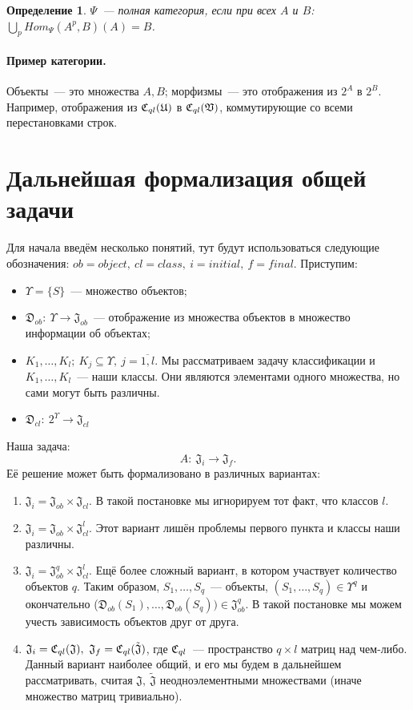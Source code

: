 \documentclass[a4paper, 12pt]{report}
\newtheorem{definition}{Определение}[chapter]
\begin{document}
\begin{definition}
$\Psi$~--- полная категория, если при всех $A$ и  $B$: $ \bigcup\limits_p Hom_{\Psi}(A^p, B)(A) = B$.
\end{definition}

\paragraph{Пример категории.} Объекты~--- это множества $A, B$; морфизмы~--- это отображения из $2^A$ в $2^B$. Например, отображения из $\mathfrak{C}_{ql}(\mathfrak{U})$ в $\mathfrak{C}_{ql}(\mathfrak{V})$, коммутирующие со всеми перестановками строк.


\section{Дальнейшая формализация общей задачи}
Для начала введём несколько понятий, тут будут использоваться следующие обозначения: $ob = object,\ cl=class,\ i=initial,\ f=final$.
Приступим:
\begin{itemize}
  \item $\Upsilon=\{S\}$~--- множество объектов;
  \item $\mathfrak{D}_{ob}:\ \Upsilon\rightarrow\mathfrak{J}_{ob}$~--- отображение из множества объектов в множество информации об объектах;
  \item $K_1,\ldots,K_l;\ K_j \subseteq \Upsilon,\ j=\overline{1,l}$. Мы рассматриваем задачу классификации и $K_1,\ldots,K_l$~--- наши классы. Они являются элементами одного множества, но сами могут быть различны.
  \item $\mathfrak{D}_{cl}:\ 2^{\Upsilon}\rightarrow\mathfrak{J}_{cl}$
\end{itemize}
Наша задача:
\[
A:\ \mathfrak{J}_i \rightarrow \mathfrak{J}_f.
\]
Её решение может быть формализовано в различных вариантах:
\begin{enumerate}
  \item $\mathfrak{J}_i = \mathfrak{J}_{ob}\times\mathfrak{J}_{cl}$. В такой постановке мы игнорируем тот факт, что классов $l$.
  \item $\mathfrak{J}_i = \mathfrak{J}_{ob}\times\mathfrak{J}_{cl}^l$. Этот вариант лишён проблемы первого пункта и классы наши различны.
  \item $\mathfrak{J}_i = \mathfrak{J}_{ob}^q\times\mathfrak{J}_{cl}^l$. Ещё более сложный вариант, в котором участвует количество объектов $q$. Таким образом, $S_1,\ldots,S_q$~--- объекты, $(S_1,\ldots,S_q)\in\Upsilon^q$ и окончательно ($\mathfrak{D}_{ob}(S_1), \ldots, \mathfrak{D}_{ob}(S_q)) \in \mathfrak{J}_{ob}^q$. В такой постановке мы можем учесть зависимость объектов друг от друга.
  \item $\mathfrak{J}_i = \Cql(\mathfrak{J}),\ \mathfrak{J}_f = \Cql(\tilde{\mathfrak{J}})$, где $\mathfrak{C}_{ql}$~--- пространство $q\times l$ матриц над чем-либо. Данный вариант наиболее общий, и его мы будем в дальнейшем рассматривать, считая $\mathfrak{J},\ \tilde{\mathfrak{J}}$ неодноэлементными множествами (иначе множество матриц тривиально).
\end{enumerate}
\end{document}
